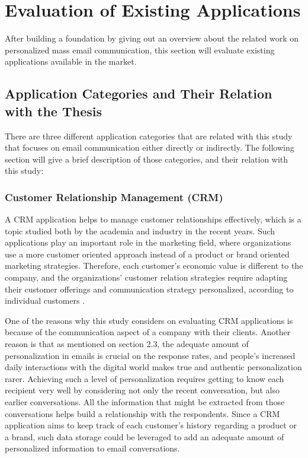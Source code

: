 \chapter{Evaluation of Existing Applications}
\label{chp:3:EvalExisAppl}
After building a foundation by giving out an overview about the related work on personalized mass email communication, this section will evaluate existing applications available in the market. 

\section{Application Categories and Their Relation with the Thesis}
\label{sec:3.1:SystCate}

There are three different application categories that are related with this study that focuses on email communication either directly or indirectly. The following section will give a brief description of those categories, and their relation with this study:

\subsection{Customer Relationship Management (CRM)}
\label{subsec:3.1.1:Cust}
A \ac{CRM} application helps to manage customer relationships effectively, which is a topic studied both by the academia and industry in the recent years. Such applications play an important role in the marketing field, where organizations use a more customer oriented approach instead of a product or brand oriented marketing strategies. Therefore, each customer's economic value is different to the company, and the organizations' customer relation strategies require adapting their customer offerings and communication strategy personalized, according to individual customers \citep{Reinartz2004}. 
\vspace{1cm}

One of the reasons why this study considers on evaluating \ac{CRM} applications is because of the communication aspect of a company with their clients. Another reason is that as mentioned on section 2.3, the adequate amount of personalization in emails is crucial on the response rates, and people's increased daily interactions with the digital world makes true and authentic personalization rarer. Achieving such a level of personalization requires getting to know each recipient very well by considering not only the recent conversation, but also earlier conversations. All the information that might be extracted from those conversations helps build a relationship with the respondents. Since a \ac{CRM} application aims to keep track of each customer's history regarding a product or a brand, such data storage could be leveraged to add an adequate amount of personalized information to email conversations. 

